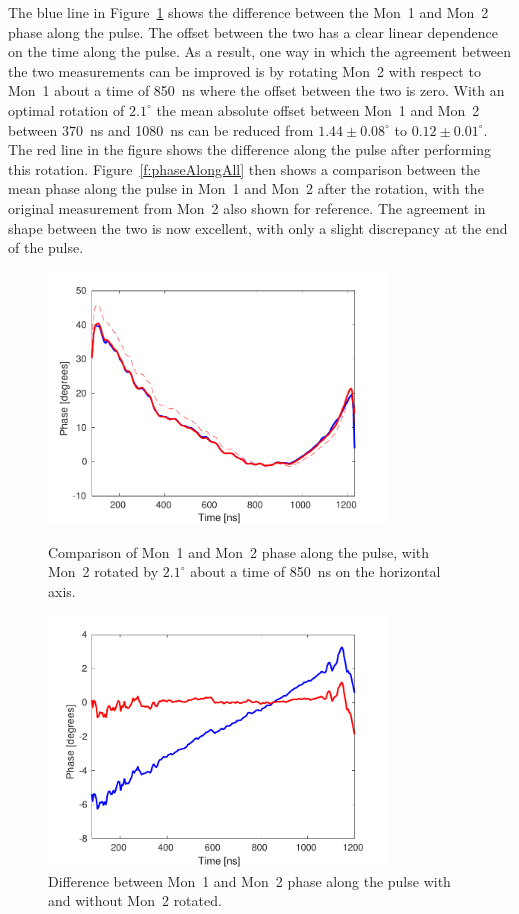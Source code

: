 The blue line in Figure~\ref{f:DiffMon1Mon2Along} shows the difference between the Mon~1 and Mon~2 phase along the pulse. The offset between the two has a clear linear dependence on the time along the pulse. As a result, one way in which the agreement between the two measurements can be improved is by rotating Mon~2 with respect to Mon~1 about a time of 850~ns where the offset between the two is zero. With an optimal rotation of \(2.1^\circ\) the mean absolute offset between Mon~1 and Mon~2 between 370~ns and 1080~ns can be reduced from \(1.44\pm0.08^\circ\) to \(0.12\pm0.01^\circ\). The red line in the figure shows the difference along the pulse after performing this rotation. Figure~\ref{f:phaseAlongAll} then shows a comparison between the mean phase along the pulse in Mon~1 and Mon~2 after the rotation, with the original measurement from Mon~2 also shown for reference. The agreement in shape between the two is now excellent, with only a slight discrepancy at the end of the pulse. 

\begin{figure}
  \centering
  \includegraphics[width=0.8\textwidth]{Figures/phaseMons/mon2Rotated}
  \caption{Comparison of Mon~1 and Mon~2 phase along the pulse, with Mon~2 rotated by \(2.1^\circ\) about a time of 850~ns on the horizontal axis.}
  \label{f:mon2Rotated}
  \includegraphics[width=0.8\textwidth]{Figures/phaseMons/DiffMon1Mon2Along}
  \caption{Difference between Mon~1 and Mon~2 phase along the pulse with and without Mon~2 rotated.}
  \label{f:DiffMon1Mon2Along}
\end{figure}

